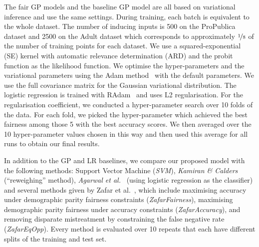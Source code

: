 The fair GP models and the baseline GP model are all based on variational inference and use the same settings.
During training, each batch is equivalent to the whole dataset.
The number of inducing inputs is 500 on the ProPublica dataset
and 2500 on the Adult dataset
which corresponds to approximately $\nicefrac{1}{8}$ of the number of training points for each dataset.
We use a squared-exponential (SE) kernel with automatic relevance determination (ARD)
and the probit function as the likelihood function.
We optimise the hyper-parameters and the variational parameters
using the Adam method~\citep{kingma2014adam} with the default parameters. %
We use the full covariance matrix for the Gaussian variational distribution.
%
The logistic regression is trained with RAdam~\citep{liu2019variance} and uses L2 regularisation.
For the regularisation coefficient, we conducted a hyper-parameter search over 10 folds of the data.
For each fold, we picked the hyper-parameter which achieved the best fairness among those 5 with
the best accuracy scores.
We then averaged over the 10 hyper-parameter values chosen in this way and then used this average for all runs to obtain our final results.

In addition to the GP and LR baselines, we compare our proposed model with the following methods:
Support Vector Machine (\emph{SVM}), \emph{Kamiran \& Calders}~\citep{kamiran2012data} (``reweighing'' method),
\emph{Agarwal et al.}~\citep{AgaBeyDudLanetal18} (using logistic regression as the classifier)
and several methods given by Zafar et al.~\citep{zafar2017fairnessconstraints,zafar2017fairnesstreatment},
which include maximising accuracy under demographic parity fairness constraints (\emph{ZafarFairness}),
maximising demographic parity fairness under accuracy constraints (\emph{ZafarAccuracy}),
and removing disparate mistreatment by constraining the false negative rate (\emph{ZafarEqOpp}).
Every method is evaluated over 10 repeats that each have different splits of the training and test set.

